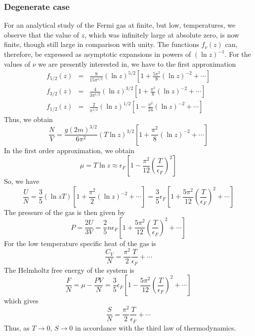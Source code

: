 \subsubsection{Degenerate case}
For an analytical study of the Fermi gas at finite, but low, temperatures, we observe that the value of $z$, which was infinitely large at absolute zero, is now finite, though still large in comparison with unity. 
The functions $f_{\nu}(z)$ can, therefore, be expressed as asymptotic expansions in powers of $(\ln z)^{-1}$.
For the values of $\nu$ we are presently interested in, we have to the first approximation
\begin{eqnarray}
f_{5/2}(z) &=& \frac{8}{15\pi^{1/2}} (\ln z)^{5/2} \left[ 1 + \frac{5\pi^2}{8}(\ln z)^{-2} + \cdots \right] \nonumber \\
f_{3/2}(z) &=& \frac{4}{3\pi^{1/2}} (\ln z)^{3/2} \left[ 1 + \frac{\pi^2}{8}(\ln z)^{-2} + \cdots \right] \nonumber \\
f_{1/2}(z) &=& \frac{2}{\pi^{1/2}} (\ln z)^{1/2} \left[ 1 - \frac{\pi^2}{24}(\ln z)^{-2} + \cdots \right] \nonumber
\end{eqnarray}
Thus, we obtain
\[\frac{N}{V} = \frac{g(2m)^{3/2}}{6\pi^2} (T\ln z)^{3/2} \left[ 1 + \frac{\pi^2}{8}(\ln z)^{-2} + \cdots \right] \]
In the first order approximation, we obtain
\[\mu = T\ln z \approx \epsilon_F \left[ 1 - \frac{\pi^2}{12} \left( \frac{T}{\epsilon_F} \right)^2 \right]\]
So, we have
\[\frac{U}{N} = \frac{3}{5} (\ln z T) \left[ 1 + \frac{\pi^2}{2}(\ln z)^{-2} + \cdots \right] = \frac{3}{5}\epsilon_F \left[ 1 + \frac{5\pi^2}{12}\left( \frac{T}{\epsilon_F} \right)^2 + \cdots \right]\]
The pressure of the gas is then given by
\[P = \frac{2U}{3V} = \frac{2}{5}n\epsilon_F\left[ 1 + \frac{5\pi^2}{12}\left( \frac{T}{\epsilon_F} \right)^2 + \cdots \right] \]
For the low temperature specific heat of the gas is
\[\frac{C_V}{N} = \frac{\pi^2}{2} \frac{T}{\epsilon_F} + \cdots\]
The Helmholtz free energy of the system is
\[\frac{F}{N} = \mu - \frac{PV}{N} = \frac{3}{5}\epsilon_F\left[ 1 - \frac{5\pi^2}{12}\left( \frac{T}{\epsilon_F} \right)^2 + \cdots \right] \]
which gives
\[\frac{S}{N} = \frac{\pi^2}{2}\frac{T}{\epsilon_F} + \cdots\]
Thus, as $T \to 0$, $S \to 0$ in accordance with the third law of thermodynamics.


